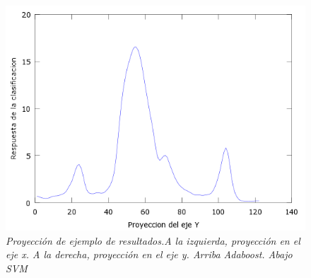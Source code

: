 \begin{figure}[H]
  \includegraphics[scale=.4]{images/plots/svm8Y}
 \caption{\em  Proyección de ejemplo de resultados.A la izquierda, proyección en el eje x. A la derecha, proyección en el eje y. Arriba Adaboost. Abajo SVM}   
 \label{fig:pro8}
\end{figure}
